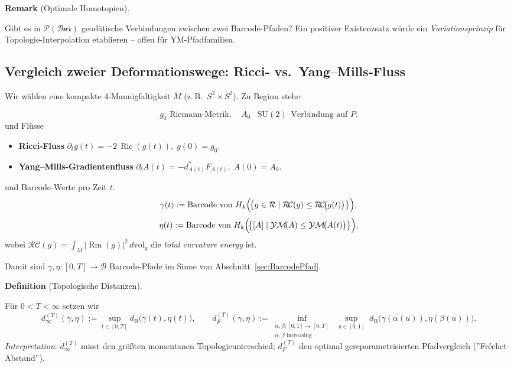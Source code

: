 \documentclass[10pt, letterpaper]{article}
\newcommand{\CustomHeading}[3]{%
  \par\medskip\noindent%
  \textbf{#1 #2} \textnormal{(#3)}.\enskip%
}
\newenvironment{DEF}[2]{\CustomHeading{Definition}{#1}{#2}}{}
\newenvironment{REM}[2]{\CustomHeading{Remark}{#1}{#2}}{}
\begin{document}
\begin{REM}{}{Optimale Homotopien}
  Gibt es in \(\mathcal P(\mathcal{Bar})\) geodätische Verbindungen
  zwischen zwei Barcode-Pfaden?  
  Ein positiver Existenzsatz würde ein \emph{Variationsprinzip} für
  Topologie-Interpolation etablieren – offen für YM-Pfadfamilien.
\end{REM}


\subsection{Vergleich zweier Deformationswege:
           Ricci‐ vs.\ Yang--Mills‐Fluss}

Wir wählen eine kompakte 4‐Mannigfaltigkeit
\(M\) (z.\,B.\ \(S^{2}\times S^{2}\)).
Zu Beginn stehe:

\[
  g_0 \text{ Riemann‐Metrik}, 
  \quad
  A_0 \text{ $\,\mathrm{SU}(2)$–Verbindung auf }P.
\]
und Flüsse  
\begin{itemize}
  \item \textbf{Ricci‐Fluss}
    \( \displaystyle\partial_t g(t)=-2\,\operatorname{Ric}(g(t)), 
       \;g(0)=g_0 \).
  \item \textbf{Yang--Mills‐Gradientenfluss}
    \( \displaystyle\partial_t A(t)=-d_{A(t)}^{\ast}F_{A(t)},
       \;A(0)=A_0. \)
\end{itemize}
und Barcode‐Werte pro Zeit \(t\).
\[
  \gamma(t)
   :=\text{Barcode von }
       H_k\Bigl(\!\bigl\{g\in\mathcal R
                       \mid \mathcal R\!\mathcal C(g)\le\mathcal R\!\mathcal C\!\bigl(g(t)\bigr)\bigr\}\Bigr),
\]
\[
  \eta(t)
   :=\text{Barcode von }
       H_k\Bigl(\!\bigl\{[A]\mid
                        \mathcal{YM}\!(A)\le\mathcal{YM}\!\bigl(A(t)\bigr)\bigr\}\Bigr),
\]
wobei
\(
  \mathcal R\!\mathcal C(g)=\int_M \lvert\!\operatorname{Rm}(g)\rvert^2\,d\mathrm{vol}_g
\)
die \emph{total curvature energy} ist.

Damit sind
\(
  \gamma,\eta:[0,T]\to\mathcal{B}
\)
Barcode‐Pfade im Sinne von Abschnitt~\ref{sec:BarcodePfad}.

\begin{DEF}{}{Topologische Distanzen}
  Für \(0<T<\infty\) setzen wir
  \[
    d_\infty^{(T)}(\gamma,\eta)
      :=\sup_{t\in[0,T]} d_{\mathrm B}\bigl(\gamma(t),\eta(t)\bigr),
    \qquad
    d_F^{(T)}(\gamma,\eta)
      :=\inf_{\substack{\alpha,\beta:[0,1]\to[0,T]\\
                         \alpha,\beta\text{ increasing}}}
         \;\sup_{u\in[0,1]}\;
         d_{\mathrm B}\!\bigl(\gamma(\alpha(u)),\eta(\beta(u))\bigr).
  \]
  \emph{Interpretation}:  
  \(d_\infty^{(T)}\) misst den größten momentanen
  Topologie­unterschied;
  \(d_F^{(T)}\) den optimal gereparametrisierten
  Pfadvergleich (”Fréchet‐Abstand”).
\end{DEF}
\end{document}
